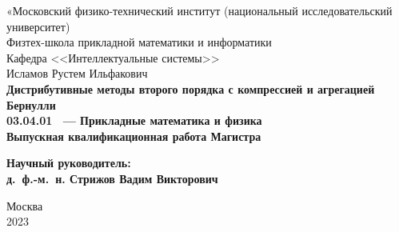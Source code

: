 \documentclass[11pt]{article}
\begin{document}
	
	
\thispagestyle{empty}
\begin{center}
	\sc
	«Московский физико-технический институт 
	{\rm (национальный
		исследовательский университет)}\\
	Физтех-школа прикладной математики и информатики\\
	Кафедра <<Интеллектуальные системы>>\\[35mm]
	\rm\large
	Исламов Рустем Ильфакович\\[10mm]
	\bf\Large
	Дистрибутивные методы второго порядка с компрессией и агрегацией Бернулли\\[10mm]
	\rm\normalsize
	03.04.01 ~--- Прикладные математика и физика\\[10mm]
	\sc
	Выпускная квалификационная работа Магистра\\[10mm]
\end{center}
\hfill\parbox{80mm}{
	\begin{flushleft}
		\bf
		Научный руководитель:\\
		\rm
		д.~ф.-м.~н. Стрижов Вадим Викторович\\[5cm]
	\end{flushleft}
}
\begin{center}
	Москва\\
	2023
\end{center}
\end{document}
